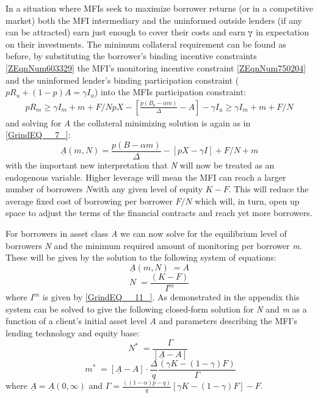 \documentclass{article} %
\begin{document}
In a situation where MFIs seek to maximize borrower returns (or in a competitive market) both the MFI intermediary and the uninformed outside lenders (if any can be attracted) earn just enough to cover their costs and earn $\mathrm{\gammaup }$ in expectation on their investments.  The minimum collateral requirement can be found as before, by substituting the borrower's binding incentive constraints \eqref{ZEqnNum603329} the MFI's monitoring incentive constraint \eqref{ZEqnNum750204} and the uninformed lender's binding participation constraint ($pR_{u} +(1-p)A=\gamma I_{u} $) into the MFIs participation constraint:
\begin{equation} \label{11)} 
\begin{array}{l} {pR_{m} \ge \gamma I_{m} +m+F/N}  {pX-\left[\frac{p(B_{0} -\alpha m)}{\Delta } -A\right]-\gamma I_{u} \ge \gamma I_{m} +m+F/N} \end{array} 
\end{equation} 
and solving for \textit{A} the collateral minimizing solution is again as in \eqref{GrindEQ__7_}: 
\[\underline{A}(m,N)=\frac{p(B-\alpha m)}{\Delta } -\left[pX-\gamma I\right]+F/N+m\] 
with the important new interpretation that \textit{N }will now be treated as an endogenous variable.  Higher leverage will mean the MFI can reach a larger number of borrowers $N$with any given level of equity $K-F$.  This will reduce the average fixed cost of borrowing per borrower $F/N$ which will, in turn, open up space to adjust the terms of the financial contracts and reach yet more borrowers.  

For borrowers in asset class \textit{A} we can now solve for the equilibrium level of borrowers \textit{N} and the minimum required amount of monitoring per borrower \textit{m}.  These will be given by the solution to the following system of equations: 
\begin{equation} \label{12)} 
\underline{A}(m,N)\phantom{.} =A 
\end{equation} 
\begin{equation} \label{13)} 
N\phantom{.} =\frac{(K-F)}{I^{m} }  
\end{equation} 
where $I^{m} $ is given by \eqref{GrindEQ__11_}.  As demonstrated in the appendix this system can be solved to give the following closed-form solution for \textit{N }and \textit{m} as a function of a client's initial asset level $A$ and parameters describing the MFI's lending technology and equity base:
\begin{equation} \label{14)} 
N^{*} \phantom{.} =\frac{\Gamma }{\left[\underline{A}-A\right]} \;  
\end{equation} 
\begin{equation} \label{15)} 
\; m^{*} \phantom{.} =\left[\underline{A}-A\right]\cdot \frac{\Delta }{q} \frac{(\gamma K-(1-\gamma )F)}{\Gamma }  
\end{equation} 
where $\underline{A}=\underline{A}(0,\infty )$ and $\Gamma ={\tfrac{((1-\alpha )p-q)}{q}} [\gamma K-(1-\gamma )F]-F$.
\end{document}
